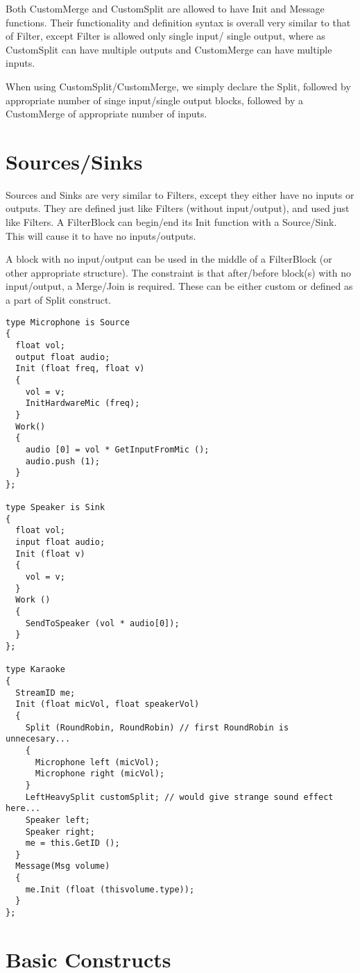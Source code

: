 Both CustomMerge and CustomSplit are allowed to have Init and Message
functions.  Their functionality and definition syntax is overall very
similar to that of Filter, except Filter is allowed only single input/
single output, where as CustomSplit can have multiple outputs and 
CustomMerge can have multiple inputs.

When using CustomSplit/CustomMerge, we simply declare the Split, followed
by appropriate number of singe input/single output blocks, followed by
a CustomMerge of appropriate number of inputs.

\section{Sources/Sinks}

Sources and Sinks are very similar to Filters, except they either have
no inputs or outputs.  They are defined just like Filters (without
input/output), and used just like Filters.  A FilterBlock can begin/end
its Init function with a Source/Sink.  This will cause it to have
no inputs/outputs.

A block with no input/output can be used in the middle of a FilterBlock (or
other appropriate structure).  The constraint is that after/before block(s) 
with no input/output, a Merge/Join is required.  These can be either
custom or defined as a part of Split construct.

\begin{verbatim}
type Microphone is Source
{
  float vol;
  output float audio;
  Init (float freq, float v)
  {
    vol = v;
    InitHardwareMic (freq);
  }
  Work()
  {
    audio [0] = vol * GetInputFromMic ();
    audio.push (1);
  }
};

type Speaker is Sink
{
  float vol;
  input float audio;
  Init (float v)
  {
    vol = v;
  }
  Work ()
  {
    SendToSpeaker (vol * audio[0]);
  }
};

type Karaoke
{
  StreamID me;
  Init (float micVol, float speakerVol)
  {
    Split (RoundRobin, RoundRobin) // first RoundRobin is unnecesary...
    {
      Microphone left (micVol);
      Microphone right (micVol);
    }
    LeftHeavySplit customSplit; // would give strange sound effect here...
    Speaker left;
    Speaker right;
    me = this.GetID ();
  }
  Message(Msg volume)
  {
    me.Init (float (thisvolume.type));
  }
};

\end{verbatim}


\section{Basic Constructs}

